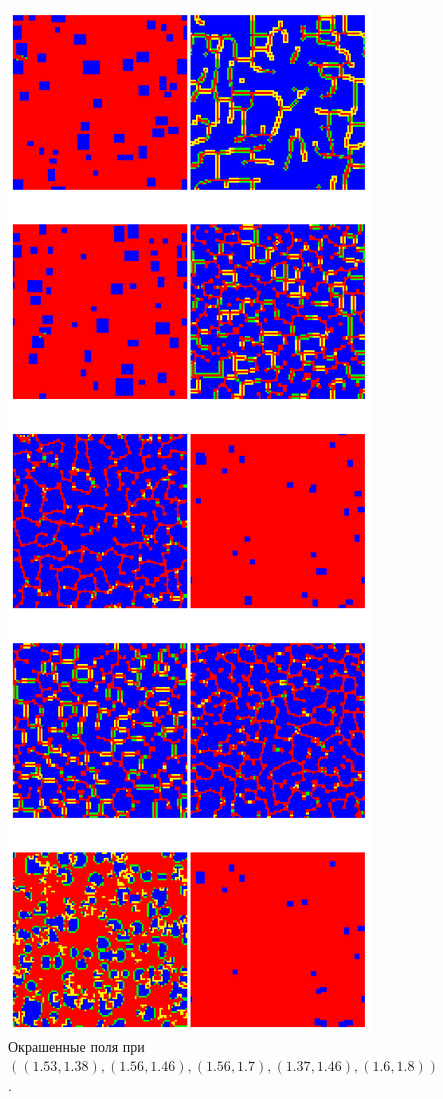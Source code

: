 \documentclass[12pt]{article}
\begin{document}
    \begin{figure}
         \centering
         \includegraphics[width=0.5\columnwidth, keepaspectratio=True]{DoubleField/colored_2fields.png}
         \caption{Окрашенные поля при $((1.53, 1.38),
          (1.56, 1.46),
          (1.56, 1.7),
          (1.37, 1.46),
          (1.6, 1.8))$.}
         \label{fig:colfields}
    \end{figure}
\end{document}
